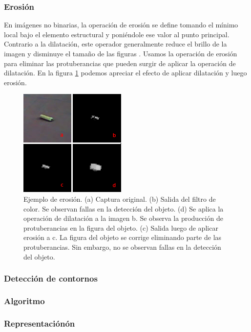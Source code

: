 	\subsubsection*{Erosi\'on}
En imágenes no binarias, la operación de erosión se define tomando el mínimo local bajo el elemento estructural y poniéndole ese valor al punto principal. Contrario a la dilatación, este operador generalmente reduce el brillo de la imagen y disminuye el tamaño de las figuras \cite{nasa-dilate-erode}. Usamos la operación de erosión para eliminar las protuberancias que pueden surgir de aplicar la operación de dilatación. En la figura \ref{fig:erode} podemos apreciar el efecto de aplicar dilatación y luego erosión.

\begin{figure}[tpb]
\begin{center}
  \includegraphics[scale=0.8]{figuras/erosion.png}
\end{center}
  \caption{\small Ejemplo de erosión. (a) Captura original. (b) Salida del filtro de color. Se observan fallas en la detección del objeto. (d) Se aplica la operación de dilatación a la imagen b. Se observa la producción de protuberancias en la figura del objeto. (c) Salida luego de aplicar erosión a c. La figura del objeto se corrige eliminando parte de las protuberancias. Sin embargo, no se observan fallas en la detección del objeto. }
  \label{fig:erode}
\end{figure}

	\subsubsection{Detección de contornos}
		\subsubsection*{Algoritmo}
		\subsubsection*{Representación\'on}
